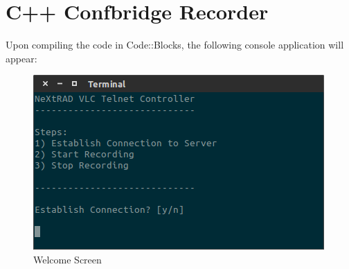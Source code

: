 \documentclass[a4paper,11pt]{report}
\begin{document}
\section{C++ Confbridge Recorder}
Upon compiling the code in Code::Blocks, the following console application will appear:
\begin{figure}[h]
  \begin{center}
    \includegraphics[scale = 0.5]{welcome}
    \caption{Welcome Screen}
  \end{center}
\end{figure}

\newpage 
\end{document}

